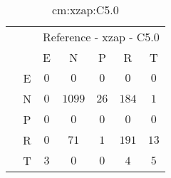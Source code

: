 \begin{table}[!ht]
	\centering
	\begin{tabular}{|c|c|c|c|c|c|c|}
		\cline{3-7}
		\multicolumn{2}{c|}{} & \multicolumn{5}{|c|}{Reference - xzap - C5.0} \\ \cline{3-7}
		\multicolumn{2}{c|}{} & E & N & P & R & T \\ \hline
		\multirow{5}{*}{\rotatebox{90}{Prediction}} & E & $0$ & $0$ & $0$ & $0$ & $0$ \\ \cline{2-7}
		 & N & $0$ & $1099$ & $26$ & $184$ & $1$ \\ \cline{2-7}
		 & P & $0$ & $0$ & $0$ & $0$ & $0$ \\ \cline{2-7}
		 & R & $0$ & $71$ & $1$ & $191$ & $13$ \\ \cline{2-7}
		 & T & $3$ & $0$ & $0$ & $4$ & $5$ \\ \hline
	\end{tabular}
	\caption{cm:xzap:C5.0}
	\label{tab:cm:xzap:C5.0}
\end{table}
